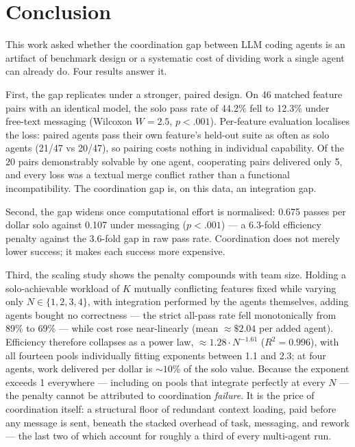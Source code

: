 \documentclass[11pt,a4paper]{article}
\begin{document}
%
%
\FloatBarrier
\section{Conclusion}\label{sec:conclusion}

This work asked whether the coordination gap between LLM coding agents is an artifact of benchmark design or a systematic cost of dividing work a single agent can already do. Four results answer it.

First, the gap replicates under a stronger, paired design. On 46 matched feature pairs with an identical model, the solo pass rate of 44.2\% fell to 12.3\% under free-text messaging (Wilcoxon $W = 2.5$, $p < .001$). Per-feature evaluation localises the loss: paired agents pass their own feature's held-out suite as often as solo agents (21/47 vs 20/47), so pairing costs nothing in individual capability. Of the 20 pairs demonstrably solvable by one agent, cooperating pairs delivered only 5, and every loss was a textual merge conflict rather than a functional incompatibility. The coordination gap is, on this data, an integration gap.

Second, the gap widens once computational effort is normalised: 0.675 passes per dollar solo against 0.107 under messaging ($p < .001$) --- a 6.3-fold efficiency penalty against the 3.6-fold gap in raw pass rate. Coordination does not merely lower success; it makes each success more expensive.

Third, the scaling study shows the penalty compounds with team size. Holding a solo-achievable workload of $K$ mutually conflicting features fixed while varying only $N \in \{1, 2, 3, 4\}$, with integration performed by the agents themselves, adding agents bought no correctness --- the strict all-pass rate fell monotonically from 89\% to 69\% --- while cost rose near-linearly (mean $\approx \$2.04$ per added agent). Efficiency therefore collapses as a power law, $\approx 1.28 \cdot N^{-1.61}$ ($R^2 = 0.996$), with all fourteen pools individually fitting exponents between 1.1 and 2.3; at four agents, work delivered per dollar is ${\sim}10\%$ of the solo value. Because the exponent exceeds 1 everywhere --- including on pools that integrate perfectly at every $N$ --- the penalty cannot be attributed to coordination \emph{failure}. It is the price of coordination itself: a structural floor of redundant context loading, paid before any message is sent, beneath the stacked overhead of task, messaging, and rework --- the last two of which account for roughly a third of every multi-agent run.
\end{document}
